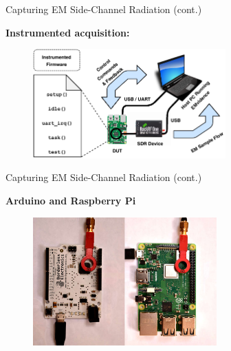 \documentclass[handout]{beamer}
\begin{document}
\begin{frame}{Capturing EM Side-Channel Radiation (cont.)}  

\footnotesize
\textbf{Instrumented acquisition:}

	\begin{figure}
		\includegraphics[width=210pt]{figures/signal-acquisition-2.pdf}
	\end{figure}

\end{frame}


\begin{frame}{Capturing EM Side-Channel Radiation (cont.)}  

\footnotesize
\textbf{Arduino and Raspberry Pi}

	\begin{figure}
		\includegraphics[width=200pt]{figures/arduino-rpi-with-antenna.jpg}
	\end{figure}

\end{frame}
\end{document}
